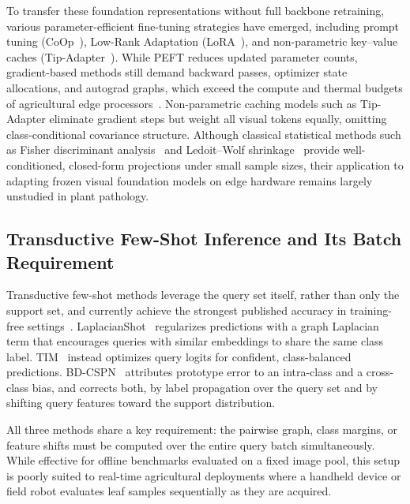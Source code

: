 \documentclass[preprint,12pt]{elsarticle}
\begin{document}
To transfer these foundation representations without full backbone retraining, various parameter-efficient fine-tuning strategies have emerged, including prompt tuning (CoOp~\cite{zhou2022coop}), Low-Rank Adaptation (LoRA~\cite{hu2022lora}), and non-parametric key--value caches (Tip-Adapter~\cite{zhang2022tip}). While PEFT reduces updated parameter counts, gradient-based methods still demand backward passes, optimizer state allocations, and autograd graphs, which exceed the compute and thermal budgets of agricultural edge processors~\cite{babu2025agrifewnet}. Non-parametric caching models such as Tip-Adapter eliminate gradient steps but weight all visual tokens equally, omitting class-conditional covariance structure. Although classical statistical methods such as Fisher discriminant analysis~\cite{fisher1936use} and Ledoit--Wolf shrinkage~\cite{ledoit2004well} provide well-conditioned, closed-form projections under small sample sizes, their application to adapting frozen visual foundation models on edge hardware remains largely unstudied in plant pathology.

\subsection{Transductive Few-Shot Inference and Its Batch Requirement}
Transductive few-shot methods leverage the query set itself, rather than only the support set, and currently achieve the strongest published accuracy in training-free settings~\cite{boudiaf2020transductive,ziko2020laplacian}. LaplacianShot~\cite{ziko2020laplacian} regularizes predictions with a graph Laplacian term that encourages queries with similar embeddings to share the same class label. TIM~\cite{boudiaf2020transductive} instead optimizes query logits for confident, class-balanced predictions. BD-CSPN~\cite{liu2021bdcspn} attributes prototype error to an intra-class and a cross-class bias, and corrects both, by label propagation over the query set and by shifting query features toward the support distribution.

All three methods share a key requirement: the pairwise graph, class margins, or feature shifts must be computed over the entire query batch simultaneously. While effective for offline benchmarks evaluated on a fixed image pool, this setup is poorly suited to real-time agricultural deployments where a handheld device or field robot evaluates leaf samples sequentially as they are acquired.
\end{document}
